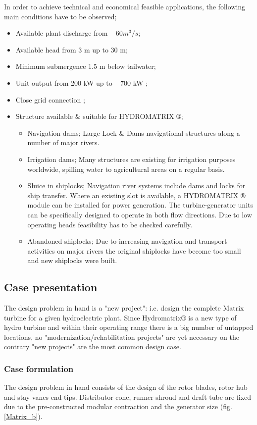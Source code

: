 In order to achieve technical and economical feasible applications, the following main conditions have to be observed; 
\begin{itemize}
\item Available plant discharge from ~ $60 m^3/s$; 
\item Available head from 3 m up to 30 m; 
\item Minimum submergence 1.5 m below tailwater;
\item Unit output from 200 kW up to ~ 700 kW ;
\item Close grid connection ;
\item Structure available $\&$ suitable for HYDROMATRIX $\circledR$; 
\begin{itemize}
	\item Navigation dams; Large Lock $\&$ Dams navigational structures along a number of major rivers. 
	\item Irrigation dams; Many structures are existing for irrigation purposes worldwide, spilling water to agricultural areas on a regular basis.
	\item Sluice in shiplocks; Navigation river systems include dams and locks for ship transfer. Where an existing slot is available, a HYDROMATRIX $\circledR$ module can be installed for power generation. The turbine-generator units can be specifically designed to operate in both flow directions. Due to low operating heads feasibility has to be checked carefully. 
	\item Abandoned shiplocks; Due to increasing navigation and transport activities on major rivers the original shiplocks have become too small and new shiplocks were built.
\end{itemize}
\end{itemize}

\subsection{Case presentation}
The design problem in hand is a "new project": i.e. design the complete Matrix turbine for a given hydroelectric plant. Since Hydromatrix$\circledR$ is a new type of hydro turbine and within their operating range there is a big number of untapped locations, no "modernization/rehabilitation projects" are yet necessary on the contrary "new projects" are the most common design case.    


\subsubsection{Case formulation}
The design problem in hand consists of the design of the rotor blades, rotor hub and stay-vanes end-tips. Distributor cone, runner shroud and draft tube are fixed due to the pre-constructed modular contraction and the generator size (fig.\ref{Matrix_b}).     


